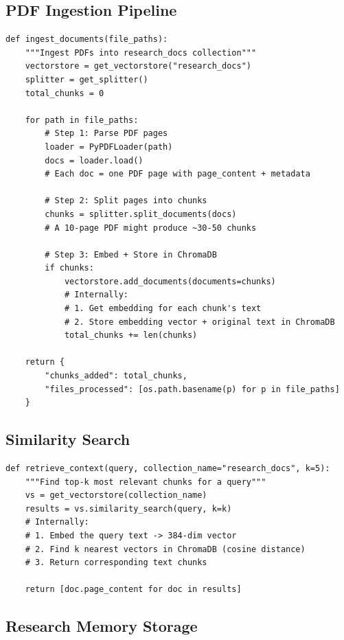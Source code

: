 \documentclass[11pt,a4paper,twoside]{report}
\begin{document}
\subsection{PDF Ingestion Pipeline}

\begin{lstlisting}[style=pythonstyle]
def ingest_documents(file_paths):
    """Ingest PDFs into research_docs collection"""
    vectorstore = get_vectorstore("research_docs")
    splitter = get_splitter()
    total_chunks = 0

    for path in file_paths:
        # Step 1: Parse PDF pages
        loader = PyPDFLoader(path)
        docs = loader.load()
        # Each doc = one PDF page with page_content + metadata

        # Step 2: Split pages into chunks
        chunks = splitter.split_documents(docs)
        # A 10-page PDF might produce ~30-50 chunks

        # Step 3: Embed + Store in ChromaDB
        if chunks:
            vectorstore.add_documents(documents=chunks)
            # Internally:
            # 1. Get embedding for each chunk's text
            # 2. Store embedding vector + original text in ChromaDB
            total_chunks += len(chunks)

    return {
        "chunks_added": total_chunks,
        "files_processed": [os.path.basename(p) for p in file_paths]
    }
\end{lstlisting}

\subsection{Similarity Search}

\begin{lstlisting}[style=pythonstyle]
def retrieve_context(query, collection_name="research_docs", k=5):
    """Find top-k most relevant chunks for a query"""
    vs = get_vectorstore(collection_name)
    results = vs.similarity_search(query, k=k)
    # Internally:
    # 1. Embed the query text -> 384-dim vector
    # 2. Find k nearest vectors in ChromaDB (cosine distance)
    # 3. Return corresponding text chunks

    return [doc.page_content for doc in results]
\end{lstlisting}

\subsection{Research Memory Storage}
\end{document}
